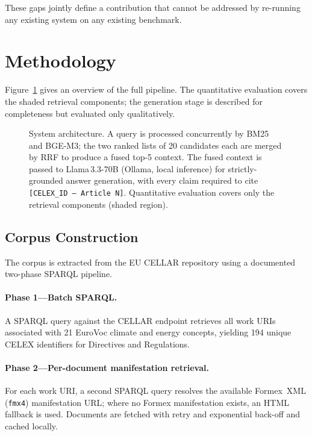\documentclass{iosart2x}
\newcommand{\bgem}{BGE-M3\xspace}
\newcommand{\rrf}{RRF\xspace}
\begin{document}
These gaps jointly define a contribution that cannot be addressed by
re-running any existing system on any existing benchmark.

\section{Methodology}
\label{sec:method}

Figure~\ref{fig:architecture} gives an overview of the full pipeline.
The quantitative evaluation covers the shaded retrieval components;
the generation stage is described for completeness but evaluated
only qualitatively.

\begin{figure}[t]
  \centering
  \fbox{\rule{0pt}{4.5cm}\rule{0.88\linewidth}{0pt}}
  \caption{System architecture.  A query is processed concurrently by
    BM25 and \bgem; the two ranked lists of 20 candidates each are
    merged by \rrf to produce a fused top-5 context.  The fused
    context is passed to Llama\,3.3-70B (Ollama, local inference) for
    strictly-grounded answer generation, with every claim required to
    cite \texttt{[CELEX\_ID\,---\,Article\,N]}.  Quantitative
    evaluation covers only the retrieval components (shaded region).}
  \label{fig:architecture}
\end{figure}

\subsection{Corpus Construction}
\label{sec:corpus}

The corpus is extracted from the EU CELLAR repository using a
documented two-phase SPARQL pipeline.

\paragraph{Phase 1---Batch SPARQL.}  A SPARQL query against the
CELLAR endpoint retrieves all work URIs associated with 21 EuroVoc
climate and energy concepts, yielding 194 unique CELEX identifiers
for Directives and Regulations.

\paragraph{Phase 2---Per-document manifestation retrieval.}
For each work URI, a second SPARQL query resolves the available
Formex~XML (\texttt{fmx4}) manifestation URL; where no Formex
manifestation exists, an HTML fallback is used.  Documents are
fetched with retry and exponential back-off and cached locally.
\end{document}

